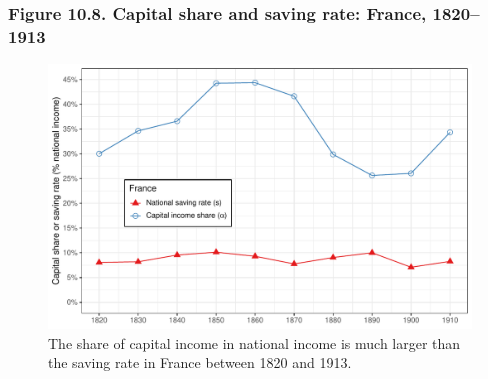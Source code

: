 \documentclass[t]{beamer}\usepackage[]{graphicx}\usepackage[]{color}
\newenvironment{knitrout}{}{} %
\begin{document}
\begin{frame}[label=Figure_10_8]
\frametitle{Figure 10.8. Capital share and saving rate: France, 1820--1913}
\begin{figure}[t]
\begin{minipage}[b]{\textwidth}
\centering
\begin{knitrout}\footnotesize
{}\color{fgcolor}

{\centering \includegraphics[width=1\linewidth]{figures/color/Figure_10_8} 

}



\end{knitrout}
\caption{The share of capital income in national income is much larger than the saving rate in France between 1820 and 1913.}
\end{minipage}
\end{figure}
\end{frame}
\end{document}
